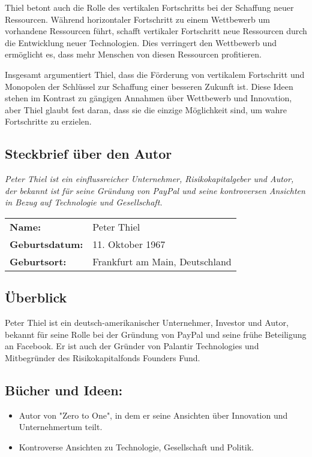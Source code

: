 \documentclass[10pt]{article}
\begin{document}
Thiel betont auch die Rolle des vertikalen Fortschritts bei der Schaffung neuer Ressourcen. Während horizontaler Fortschritt zu einem Wettbewerb um vorhandene Ressourcen führt, schafft vertikaler Fortschritt neue Ressourcen durch die Entwicklung neuer Technologien. Dies verringert den Wettbewerb und ermöglicht es, dass mehr Menschen von diesen Ressourcen profitieren.

Insgesamt argumentiert Thiel, dass die Förderung von vertikalem Fortschritt und Monopolen der Schlüssel zur Schaffung einer besseren Zukunft ist. Diese Ideen stehen im Kontrast zu gängigen Annahmen über Wettbewerb und Innovation, aber Thiel glaubt fest daran, dass sie die einzige Möglichkeit sind, um wahre Fortschritte zu erzielen.

\clearpage


\begin{center}
\section*{Steckbrief über den Autor}
\textit{Peter Thiel ist ein einflussreicher Unternehmer, Risikokapitalgeber und Autor, der bekannt ist für seine Gründung von PayPal und seine kontroversen Ansichten in Bezug auf Technologie und Gesellschaft.}
\end{center}

\begin{tabular}{ll}
\textbf{Name:} & Peter Thiel \\
\textbf{Geburtsdatum:} & 11. Oktober 1967 \\
\textbf{Geburtsort:} & Frankfurt am Main, Deutschland \\
\end{tabular}

\subsection*{Überblick}
Peter Thiel ist ein deutsch-amerikanischer Unternehmer, Investor und Autor, bekannt für seine Rolle bei der Gründung von PayPal und seine frühe Beteiligung an Facebook. Er ist auch der Gründer von Palantir Technologies und Mitbegründer des Risikokapitalfonds Founders Fund.

\subsection*{Bücher und Ideen:}
\begin{itemize}
\item Autor von "Zero to One", in dem er seine Ansichten über Innovation und Unternehmertum teilt.
\item Kontroverse Ansichten zu Technologie, Gesellschaft und Politik.
\end{itemize}
\end{document}
